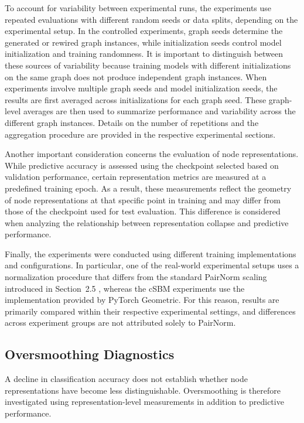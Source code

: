 \documentclass[english]{lni}
\begin{document}
To account for variability between experimental runs, the experiments use repeated evaluations with different random seeds or data splits, depending on the experimental setup. In the controlled experiments, graph seeds determine the generated or rewired graph instances, while initialization seeds control model initialization and training randomness. It is important to distinguish between these sources of variability because training models with different initializations on the same graph does not produce independent graph instances. When experiments involve multiple graph seeds and model initialization seeds, the results are first averaged across initializations for each graph seed. These graph-level averages are then used to summarize performance and variability across the different graph instances. Details on the number of repetitions and the aggregation procedure are provided in the respective experimental sections.

Another important consideration concerns the evaluation of node representations. While predictive accuracy is assessed using the checkpoint selected based on validation performance, certain representation metrics are measured at a predefined training epoch. As a result, these measurements reflect the geometry of node representations at that specific point in training and may differ from those of the checkpoint used for test evaluation. This difference is considered when analyzing the relationship between representation collapse and predictive performance.

Finally, the experiments were conducted using different training
implementations and configurations. In particular, one of the real-world experimental setups uses a normalization procedure that differs from the standard PairNorm scaling introduced in Section~2.5 \cite{zhao2020pairnorm}, whereas the cSBM experiments use the implementation provided by PyTorch Geometric. For this reason, results are primarily compared within their respective experimental settings, and differences across experiment groups are not attributed solely to PairNorm.

\subsection{Oversmoothing Diagnostics}
\label{sec:oversmoothing-diagnostics}

A decline in classification accuracy does not establish whether node representations have become less distinguishable. Oversmoothing is therefore investigated using representation-level measurements in addition to predictive performance.
\end{document}
